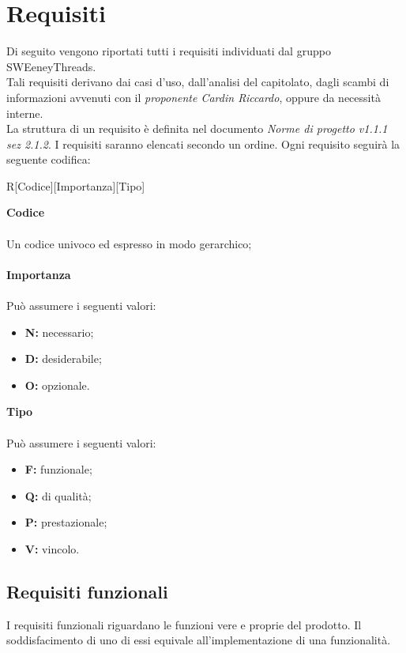 \documentclass[a4paper]{article}
\begin{document}
	\newpage \section{Requisiti}
		Di seguito vengono riportati tutti i requisiti individuati dal gruppo SWEeneyThreads. \\Tali requisiti
		derivano dai casi d'uso, dall'analisi del capitolato, dagli scambi di informazioni avvenuti con il
		\emph{proponente Cardin Riccardo}, oppure da necessità interne. \\
		La struttura di un requisito è definita nel documento \emph{Norme di progetto v1.1.1 sez 2.1.2}.
		I requisiti saranno elencati secondo un ordine. Ogni requisito seguirà la seguente codifica: \\
		\begin{center}
			R[Codice][Importanza][Tipo]
		\end{center}
		\textbf{Codice} \\ \\ Un codice univoco ed espresso in modo gerarchico;\\ \\
		\textbf{Importanza} \\ \\Può assumere i seguenti valori:
		\begin{itemize}
			\item \textbf{N:} necessario;
			\item \textbf{D:} desiderabile;
			\item \textbf{O:} opzionale.
		\end{itemize}
		\textbf{Tipo} \\ \\Può assumere i seguenti valori:
		\begin{itemize}
			\item \textbf{F:} funzionale;
			\item \textbf{Q:} di qualità;
			\item \textbf{P:} prestazionale;
			\item \textbf{V:} vincolo.
		\end{itemize}
	
	\subsection{Requisiti funzionali}
	I requisiti funzionali riguardano le funzioni vere e proprie del prodotto. Il soddisfacimento di uno di essi
	equivale all'implementazione di una funzionalità.
\end{document}
